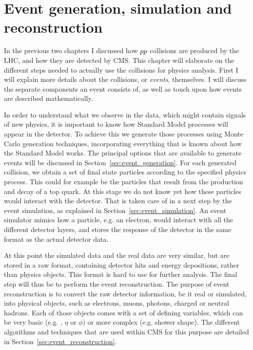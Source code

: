 \chapter[Event generation, simulation, reconstruction]{Event generation, simulation and
reconstruction \label{chap:event_generation}}

In the previous two chapters I discussed how ${p}{p}$ collisions are produced by the LHC, and
how they are detected by CMS. This chapter will elaborate on the different
steps needed to actually use the collisions for physics analysis. 
First I will explain more details about the collisions, or \textit{events}, themselves. I will
discuss the separate components an event consists of, as well as touch upon how events are described
mathematically. 

In order to understand what we observe in the data, which might contain signals of new physics, it
is important to know how Standard Model processes will appear in the detector. To achieve this we
generate those processes using Monte Carlo generation techniques, incorporating everything that is
known about how the Standard Model works. The principal options that are available to generate
events will be discussed in Section~\ref{sec:event_generation}. 
For each generated collision, we obtain a set of final state particles according to the specified
physics process. This could for example be the particles that result from the production and decay
of a top quark. 
At this stage we do not know yet how these particles would interact with the detector. That is
taken care of in a next step by the event simulation, as explained in
Section~\ref{sec:event_simulation}. An event simulator mimics how a particle, e.g. an electron,
would interact with all the different detector layers, and stores the response of the detector in
the same format as the actual detector data. 

At this point the simulated data and the real data are very similar, but are stored in a raw format,
containing detector hits and energy depositions, rather than physics objects. This format is hard to
use for further analysis. The final step will thus be to perform the event reconstruction. The
purpose of event reconstruction is to convert the raw detector information, be it real or simulated,
into physical objects, such as electrons, muons, photons, charged or neutral hadrons. Each of those
objects comes with a set of defining variables, which can be very basic (e.g. \pt, $\eta$ or $\phi$)
or more complex (e.g. shower shape). The different algorithms and techniques that are used within
CMS for this purpose are detailed in Section~\ref{sec:event_reconstruction}. 

